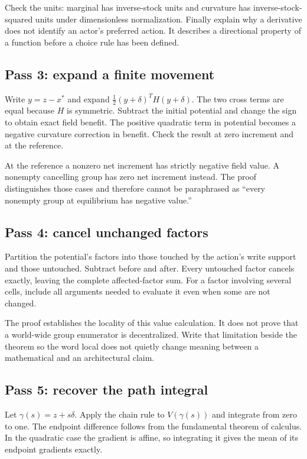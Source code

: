 Check the units: marginal has inverse-stock units and curvature has
inverse-stock-squared units under dimensionless normalization. Finally
explain why a derivative does not identify an actor's preferred action.
It describes a directional property of a function before a choice rule
has been defined.

\subsection{Pass 3: expand a finite movement}
Write $y=z-x^*$ and expand
$\tfrac12(y+\delta)^TH(y+\delta)$. The two cross terms
are equal because $H$ is symmetric. Subtract the initial potential
and change the sign to obtain exact field benefit. The positive
quadratic term in potential becomes a negative curvature correction
in benefit. Check the result at zero increment and at the reference.

At the reference a nonzero net increment has strictly negative field
value. A nonempty cancelling group has zero net increment instead.
The proof distinguishes those cases and therefore cannot be paraphrased
as ``every nonempty group at equilibrium has negative value.''

\subsection{Pass 4: cancel unchanged factors}
Partition the potential's factors into those touched by the action's
write support and those untouched. Subtract before and after. Every
untouched factor cancels exactly, leaving the complete affected-factor
sum. For a factor involving several cells, include all arguments needed
to evaluate it even when some are not changed.

The proof establishes the locality of this value calculation. It does
not prove that a world-wide group enumerator is decentralized. Write
that limitation beside the theorem so the word local does not quietly
change meaning between a mathematical and an architectural claim.

\subsection{Pass 5: recover the path integral}
Let $\gamma(s)=z+s\delta$. Apply the chain rule to
$V(\gamma(s))$ and integrate from zero to one. The endpoint
difference follows from the fundamental theorem of calculus. In the
quadratic case the gradient is affine, so integrating it gives the
mean of its endpoint gradients exactly.

